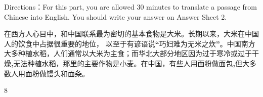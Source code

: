 \documentclass[UTF8,11pt]{ctexart}
\begin{document}
Directions：For this part, you are allowed 30 minutes to translate a passage from Chinese into English. You should write your answer on Answer Sheet 2.


在西方人心目中，和中国联系最为密切的基本食物是大米。长期以来，大米在中国人的饮食中占据很重要的地位， 以至于有谚语说\textbf{“}巧妇难为无米之炊\textbf{”}。中国南方大多种植水稻，人们通常以大米为主食；而华北大部分地区因为过于寒冷或过于干燥\textbf{,}无法种植水稻，那里的主要作物是小麦。在中国，有些人用面粉做面包\textbf{,}但大多数人用面粉做馒头和面条。


8
\end{document}
